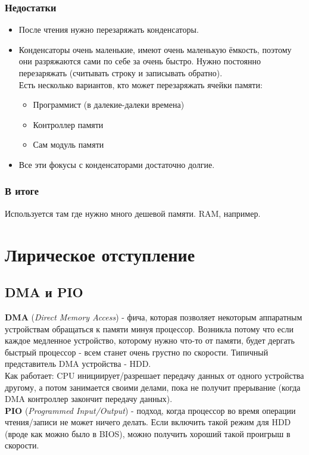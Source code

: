 \documentclass[12pt, a4paper]{article}
\begin{document}
\subsubsection{Недостатки}
\begin{itemize}
    \item После чтения нужно перезаряжать конденсаторы.
    \item Конденсаторы очень маленькие, имеют очень маленькую ёмкость, поэтому они разряжаются сами по себе за очень быстро. Нужно постоянно перезаряжать (считывать строку и записывать обратно).\\
    Есть несколько вариантов, кто может перезаряжать ячейки памяти:\\
    \begin{itemize}
        \item Программист (в далекие-далеки времена)
        \item Контроллер памяти
        \item Сам модуль памяти
    \end{itemize}
    \item Все эти фокусы с конденсаторами достаточно долгие.
\end{itemize}
\subsubsection{В итоге}
Используется там где нужно много дешевой памяти. RAM, например.
\section{Лирическое отступление}
\subsection{DMA и PIO}
\textbf{DMA} (\textit{Direct Memory Access}) - фича, которая позволяет некоторым аппаратным устройствам обращаться к памяти минуя процессор. Возникла потому что если каждое медленное устройство, которому нужно что-то от памяти, будет дергать быстрый процессор - всем станет очень грустно по скорости. Типичный представитель DMA устройства - HDD.\\
Как работает: CPU инициирует/разрешает передачу данных от одного устройства другому, а потом занимается своими делами, пока не получит прерывание (когда DMA контроллер закончит передачу данных).\\
\textbf{PIO} (\textit{Programmed Input/Output}) - подход, когда процессор во время операции чтения/записи не может ничего делать. Если включить такой режим для HDD (вроде как можно было в BIOS), можно получить хороший такой проигрыш в скорости.
\end{document}
